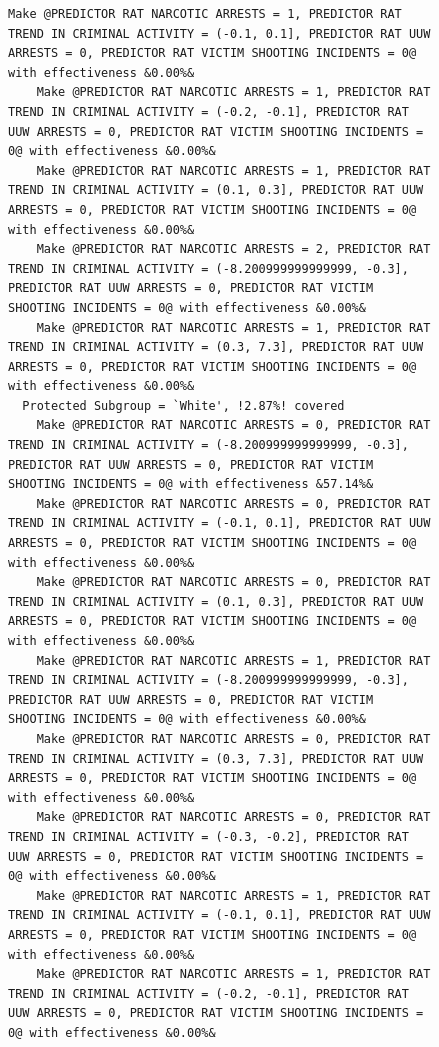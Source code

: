 \documentclass{article}
\begin{document}
\begin{figure}[ht]
\begin{minipage}{1\linewidth}
\begin{lstlisting}[style = base,escapechar=+]
    Make @PREDICTOR RAT NARCOTIC ARRESTS = 1, PREDICTOR RAT TREND IN CRIMINAL ACTIVITY = (-0.1, 0.1], PREDICTOR RAT UUW ARRESTS = 0, PREDICTOR RAT VICTIM SHOOTING INCIDENTS = 0@ with effectiveness &0.00%&
    Make @PREDICTOR RAT NARCOTIC ARRESTS = 1, PREDICTOR RAT TREND IN CRIMINAL ACTIVITY = (-0.2, -0.1], PREDICTOR RAT UUW ARRESTS = 0, PREDICTOR RAT VICTIM SHOOTING INCIDENTS = 0@ with effectiveness &0.00%&
    Make @PREDICTOR RAT NARCOTIC ARRESTS = 1, PREDICTOR RAT TREND IN CRIMINAL ACTIVITY = (0.1, 0.3], PREDICTOR RAT UUW ARRESTS = 0, PREDICTOR RAT VICTIM SHOOTING INCIDENTS = 0@ with effectiveness &0.00%&
    Make @PREDICTOR RAT NARCOTIC ARRESTS = 2, PREDICTOR RAT TREND IN CRIMINAL ACTIVITY = (-8.200999999999999, -0.3], PREDICTOR RAT UUW ARRESTS = 0, PREDICTOR RAT VICTIM SHOOTING INCIDENTS = 0@ with effectiveness &0.00%&
    Make @PREDICTOR RAT NARCOTIC ARRESTS = 1, PREDICTOR RAT TREND IN CRIMINAL ACTIVITY = (0.3, 7.3], PREDICTOR RAT UUW ARRESTS = 0, PREDICTOR RAT VICTIM SHOOTING INCIDENTS = 0@ with effectiveness &0.00%&
  Protected Subgroup = `White', !2.87%! covered
    Make @PREDICTOR RAT NARCOTIC ARRESTS = 0, PREDICTOR RAT TREND IN CRIMINAL ACTIVITY = (-8.200999999999999, -0.3], PREDICTOR RAT UUW ARRESTS = 0, PREDICTOR RAT VICTIM SHOOTING INCIDENTS = 0@ with effectiveness &57.14%&
    Make @PREDICTOR RAT NARCOTIC ARRESTS = 0, PREDICTOR RAT TREND IN CRIMINAL ACTIVITY = (-0.1, 0.1], PREDICTOR RAT UUW ARRESTS = 0, PREDICTOR RAT VICTIM SHOOTING INCIDENTS = 0@ with effectiveness &0.00%&
    Make @PREDICTOR RAT NARCOTIC ARRESTS = 0, PREDICTOR RAT TREND IN CRIMINAL ACTIVITY = (0.1, 0.3], PREDICTOR RAT UUW ARRESTS = 0, PREDICTOR RAT VICTIM SHOOTING INCIDENTS = 0@ with effectiveness &0.00%&
    Make @PREDICTOR RAT NARCOTIC ARRESTS = 1, PREDICTOR RAT TREND IN CRIMINAL ACTIVITY = (-8.200999999999999, -0.3], PREDICTOR RAT UUW ARRESTS = 0, PREDICTOR RAT VICTIM SHOOTING INCIDENTS = 0@ with effectiveness &0.00%&
    Make @PREDICTOR RAT NARCOTIC ARRESTS = 0, PREDICTOR RAT TREND IN CRIMINAL ACTIVITY = (0.3, 7.3], PREDICTOR RAT UUW ARRESTS = 0, PREDICTOR RAT VICTIM SHOOTING INCIDENTS = 0@ with effectiveness &0.00%&
    Make @PREDICTOR RAT NARCOTIC ARRESTS = 0, PREDICTOR RAT TREND IN CRIMINAL ACTIVITY = (-0.3, -0.2], PREDICTOR RAT UUW ARRESTS = 0, PREDICTOR RAT VICTIM SHOOTING INCIDENTS = 0@ with effectiveness &0.00%&
    Make @PREDICTOR RAT NARCOTIC ARRESTS = 1, PREDICTOR RAT TREND IN CRIMINAL ACTIVITY = (-0.1, 0.1], PREDICTOR RAT UUW ARRESTS = 0, PREDICTOR RAT VICTIM SHOOTING INCIDENTS = 0@ with effectiveness &0.00%&
    Make @PREDICTOR RAT NARCOTIC ARRESTS = 1, PREDICTOR RAT TREND IN CRIMINAL ACTIVITY = (-0.2, -0.1], PREDICTOR RAT UUW ARRESTS = 0, PREDICTOR RAT VICTIM SHOOTING INCIDENTS = 0@ with effectiveness &0.00%&

\end{lstlisting}
\end{minipage}
\end{figure}
\end{document}
